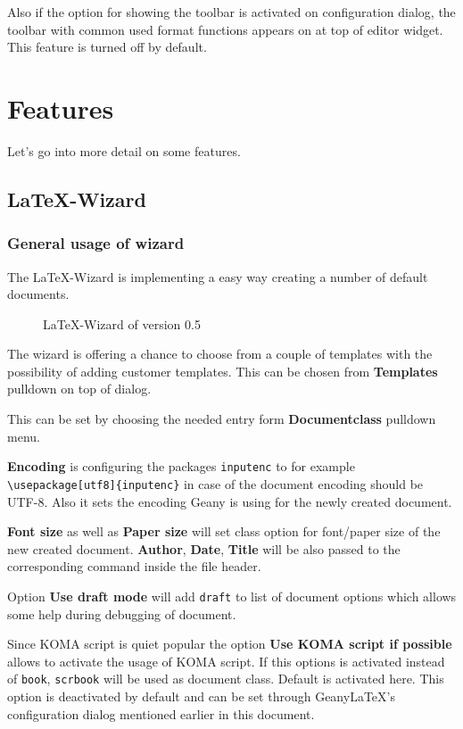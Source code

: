 \documentclass[%
paper=a4,%
fontsize=11pt,%
twoside=false,%
DIV18,%
headsepline,%
plainheadsepline,%
footsepline,%
plainfootsepline,%
bibliography=totoc,%
listof=totoc,%
BCOR10mm,%
parskip=half,%
openany,%
]{scrartcl}
\begin{document}
Also if the option for showing the toolbar is activated on configuration
dialog, the toolbar with common used format functions appears on at top
of editor widget. This feature is turned off by default.


\section{Features}

Let's go into more detail on some features.


\subsection{\LaTeX-Wizard}

\subsubsection{General usage of wizard}
The \LaTeX-Wizard is implementing a easy way creating a number of
default documents.
\begin{figure}[h!]
	\caption{\LaTeX-Wizard of version 0.5}
\end{figure}

The wizard is offering a chance to choose from a couple of templates
with the possibility of adding customer templates. This can be
chosen from \textbf{Templates} pulldown on top of dialog.

This can be set by choosing the needed entry form
\textbf{Documentclass} pulldown menu.

\textbf{Encoding} is configuring the packages \texttt{inputenc} to
for example \texttt{\textbackslash usepackage[utf8]\{inputenc\}} in
case of the document encoding should be UTF-8. Also it sets the
encoding Geany is using for the newly created document.

\textbf{Font size} as well as \textbf{Paper size} will set class option
for font/paper size of the new created document. \textbf{Author},
\textbf{Date}, \textbf{Title} will be also passed to the corresponding
command inside the file header.

Option \textbf{Use draft mode} will add \texttt{draft} to list of
document options which allows some help during debugging of document.

Since KOMA script is quiet popular the option \textbf{Use KOMA script
if possible} allows to activate the usage of KOMA script. If this
options is activated instead of \texttt{book}, \texttt{scrbook} will
be used as document class. Default is activated here. This option is
deactivated by default and can be set through Geany\LaTeX{}'s
configuration dialog mentioned earlier in this document.
\end{document}
